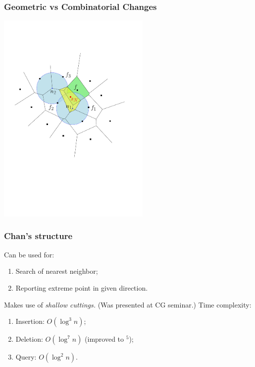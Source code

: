 \begin{frame} \frametitle{Geometric vs Combinatorial Changes} \label{pg:combvsgeom}
\begin{center}
	\includegraphics[width=7.4cm]{flarb/identChanges}
\end{center}
\end{frame}

\begin{frame} \frametitle{Chan's structure}
Can be used for:
	\begin{enumerate}
	\item Search of nearest neighbor;
	\item Reporting extreme point in given direction.
	\end{enumerate} \bigskip
Makes use of {\it shallow cuttings.} (Was presented at CG seminar.) Time complexity:
	\begin{enumerate}
	\item Insertion: $O(\log^3 n)$;
	\item Deletion: $O(\log^7 n)$ (improved to $^5$);
	\item Query: $O(\log^2 n)$.
	\end{enumerate}
\end{frame}

